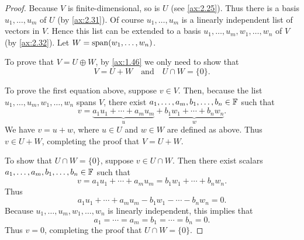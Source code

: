 \begin{proof}
Because $V$ is finite-dimensional, so is $U$ (see \ref{ax:2.25}). Thus there is
a basis $u_1,\dots,u_m$ of $U$ (by \ref{ax:2.31}). Of course $u_1,\dots,u_m$ is a
linearly independent list of vectors in $V$. Hence this list can be extended to
a basis $u_1,\dots,u_m,w_1,\dots,w_n$ of $V$ (by \ref{ax:2.32}). Let
$W=\operatorname{span}(w_1,\dots,w_n)$.

To prove that $V=U\oplus W$, by \ref{ax:1.46} we only need to show that
\[ V=U+W \quad\text{and}\quad U\cap W=\{0\}. \]

To prove the first equation above, suppose $v\in V$. Then, because the list
$u_1,\dots,u_m,w_1,\dots,w_n$ spans $V$, there exist
$a_1,\dots,a_m,b_1,\dots,b_n\in\mathbb{F}$ such that
\[ v = \underbrace{a_1u_1+\cdots+a_mu_m}_{u}
     + \underbrace{b_1w_1+\cdots+b_nw_n}_{w}. \]
We have $v=u+w$, where $u\in U$ and $w\in W$ are defined as above. Thus
$v\in U+W$, completing the proof that $V=U+W$.

To show that $U\cap W=\{0\}$, suppose $v\in U\cap W$. Then there exist scalars
$a_1,\dots,a_m,b_1,\dots,b_n\in\mathbb{F}$ such that
\[ v = a_1u_1+\cdots+a_mu_m = b_1w_1+\cdots+b_nw_n. \]
Thus
\[ a_1u_1+\cdots+a_mu_m-b_1w_1-\cdots-b_nw_n = 0. \]
Because $u_1,\dots,u_m,w_1,\dots,w_n$ is linearly independent, this implies that
\[ a_1=\cdots=a_m=b_1=\cdots=b_n=0. \]
Thus $v=0$, completing the proof that $U\cap W=\{0\}$.
\end{proof}

